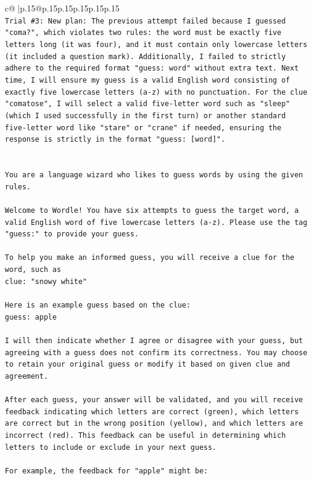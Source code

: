 \documentclass{article}
\begin{document}
{\begin{supertabular}{c@{$\;$}|p{.15\linewidth}@{}p{.15\linewidth}p{.15\linewidth}p{.15\linewidth}p{.15\linewidth}p{.15\linewidth}}
{{{\\ 
\texttt{Trial \#3: New plan: The previous attempt failed because I guessed "coma?", which violates two rules: the word must be exactly five letters long (it was four), and it must contain only lowercase letters (it included a question mark). Additionally, I failed to strictly adhere to the required format "guess: word" without extra text. Next time, I will ensure my guess is a valid English word consisting of exactly five lowercase letters (a{-}z) with no punctuation. For the clue "comatose", I will select a valid five{-}letter word such as "sleep" (which I used successfully in the first turn) or another standard five{-}letter word like "stare" or "crane" if needed, ensuring the response is strictly in the format "guess: {[}word{]}".} \\
\\ 
\\ 
\texttt{You are a language wizard who likes to guess words by using the given rules.} \\
\\ 
\texttt{Welcome to Wordle! You have six attempts to guess the target word, a valid English word of five lowercase letters (a{-}z). Please use the tag "guess:" to provide your guess.} \\
\\ 
\texttt{To help you make an informed guess, you will receive a clue for the word, such as} \\
\texttt{clue: "snowy white"} \\
\\ 
\texttt{Here is an example guess based on the clue: } \\
\texttt{guess: apple} \\
\\ 
\texttt{I will then indicate whether I agree or disagree with your guess, but agreeing with a guess does not confirm its correctness. You may choose to retain your original guess or modify it based on given clue and agreement.} \\
\\ 
\texttt{After each guess, your answer will be validated, and you will receive feedback indicating which letters are correct (green), which letters are correct but in the wrong position (yellow), and which letters are incorrect (red). This feedback can be useful in determining which letters to include or exclude in your next guess.} \\
\\ 
\texttt{For example, the feedback for "apple" might be:} \\
}}}
\end{supertabular}}
\end{document}
